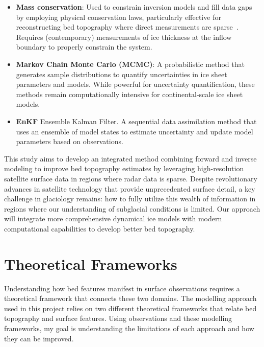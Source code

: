 \begin{itemize}
\begin{itemize}
            \item\textbf{Mass conservation}: Used to constrain inversion models and fill data gaps by employing physical conservation laws, particularly effective for reconstructing bed topography where direct measurements are sparse~\cite{Morlighem_2017, Morlighem_2020}. Requires (contemporary) measurements of ice thickness at the inflow boundary to properly constrain the system\cite{Morlighem_Goldberg_2024}.

            \item\textbf{Markov Chain Monte Carlo (MCMC)}: A probabilistic method that generates sample distributions to quantify uncertainties in ice sheet parameters and models\cite{Morlighem_Goldberg_2024}. While powerful for uncertainty quantification, these methods remain computationally intensive for continental-scale ice sheet models\cite{Morlighem_Goldberg_2024}.

            \item\textbf{EnKF} Ensemble Kalman Filter. A sequential data assimilation method that uses an ensemble of model states to estimate uncertainty and update model parameters based on observations\cite{Morlighem_Goldberg_2024}.
        \end{itemize}
    
\end{itemize} 
This study aims to develop an integrated method combining forward and inverse modeling to improve bed topography estimates by leveraging high-resolution satellite surface data in regions where radar data is sparse. Despite revolutionary advances in satellite technology that provide unprecedented surface detail, a key challenge in glaciology remains: how to fully utilize this wealth of information in regions where our understanding of subglacial conditions is limited. Our approach will integrate more comprehensive dynamical ice models with modern computational capabilities to develop better bed topography.

\newpage
\section{Theoretical Frameworks}
 Understanding how bed features manifest in surface observations requires a theoretical framework that connects these two domains. The modelling approach used in this project relies on two different theoretical frameworks that relate bed topography and surface features. Using observations and these modelling frameworks, my goal is understanding the limitations of each approach and how they can be improved.

